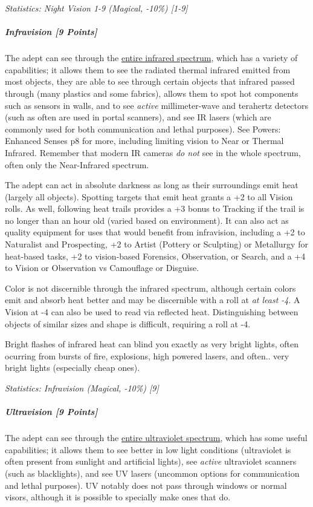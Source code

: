 \begin{multicols}{3}
		\textcolor{OliveGreen}{\textit{Statistics: Night Vision 1-9 (Magical, -10\%) [1-9]}}
		
	\subparagraph{Infravision [9 Points]}
	
		The adept can see through the \textcolor{NavyBlue}{\href{https://en.wikipedia.org/wiki/Infrared}{entire infrared spectrum}}, which has a variety of capabilities; it allows them to see the radiated thermal infrared emitted from most objects, they are able to see through certain objects that infrared passed through (many plastics and some fabrics), allows them to spot hot components such as sensors in walls, and to see \textit{active} millimeter-wave and terahertz detectors (such as often are used in portal scanners), and see IR lasers (which are commonly used for both communication and lethal purposes). See Powers: Enhanced Senses p8 for more, including limiting vision to Near or Thermal Infrared. Remember that modern IR cameras \textit{do not} see in the whole spectrum, often only the Near-Infrared spectrum.
		
		The adept can act in absolute darkness as long as their surroundings emit heat (largely all objects). Spotting targets that emit heat grants a +2 to all Vision rolls. As well, following heat trails provides a +3 bonus to Tracking if the trail is no longer than an hour old (varied based on environment). It can also act as quality equipment for uses that would benefit from infravision, including a +2 to Naturalist and Prospecting, +2 to Artist (Pottery or Sculpting) or Metallurgy for heat-based tasks, +2 to vision-based Forensics, Observation, or Search, and a +4 to Vision or Observation vs Camouflage or Disguise.
		
		Color is not discernible through the infrared spectrum, although certain colors emit and absorb heat better and may be discernible with a roll at \textit{at least -4}. A Vision at -4 can also be used to read via reflected heat. Distinguishing between objects of similar sizes and shape is difficult, requiring a roll at -4. 
		
		Bright flashes of infrared heat can blind you exactly as very bright lights, often ocurring from bursts of fire, explosions, high powered lasers, and often.. very bright lights (especially cheap ones).
	
		\textcolor{OliveGreen}{\textit{Statistics: Infravision (Magical, -10\%) [9] }}
			
	\subparagraph{Ultravision [9 Points]}
	
		The adept can see through the \textcolor{NavyBlue}{\href{https://en.wikipedia.org/wiki/Ultraviolet}{entire ultraviolet spectrum}}, which has some useful capabilities; it allows them to see better in low light conditions (ultraviolet is often present from sunlight and artificial lights), see \textit{active} ultraviolet scanners (such as blacklights), and see UV lasers (uncommon options for communication and lethal purposes). UV notably does not pass through windows or normal visors, although it is possible to specially make ones that do.
		

\end{multicols}
